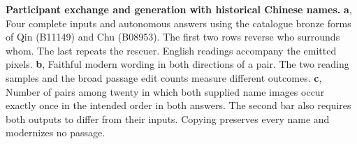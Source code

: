 \textbf{Participant exchange and generation with historical Chinese names.} \textbf{a}, Four complete inputs and autonomous answers using the catalogue bronze forms of Qin (B11149) and Chu (B08953). The first two rows reverse who surrounds whom. The last repeats the rescuer. English readings accompany the emitted pixels. \textbf{b}, Faithful modern wording in both directions of a pair. The two reading samples and the broad passage edit counts measure different outcomes. \textbf{c}, Number of pairs among twenty in which both supplied name images occur exactly once in the intended order in both answers. The second bar also requires both outputs to differ from their inputs. Copying preserves every name and modernizes no passage.
